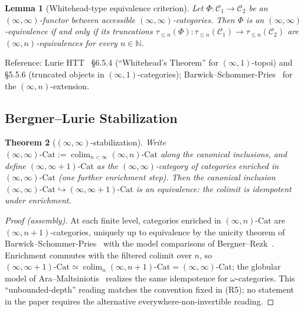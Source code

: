 \documentclass[11pt]{article}
\theoremstyle{plain}
\newtheorem{theorem}{Theorem}[section]
\newtheorem{lemma}[theorem]{Lemma}
\theoremstyle{definition}
\newcommand{\cC}{\mathcal{C}}
\newcommand{\Cat}{\mathrm{Cat}}
\DeclareMathOperator{\colim}{colim}
\begin{document}
\begin{lemma}[Whitehead-type equivalence criterion]\label{lem:whitehead}
Let $\Phi : \cC_1 \to \cC_2$ be an $(\infty, \infty)$-functor between accessible $(\infty, \infty)$-categories. Then $\Phi$ is an $(\infty, \infty)$-equivalence if and only if its truncations $\tau_{\leq n}(\Phi) : \tau_{\leq n}(\cC_1) \to \tau_{\leq n}(\cC_2)$ are $(\infty, n)$-equivalences for every $n \in \mathbb{N}$.
\end{lemma}

Reference: Lurie HTT~\cite{LurieHTT} \S 6.5.4 (``Whitehead's Theorem'' for $(\infty, 1)$-topoi) and \S 5.5.6 (truncated objects in $(\infty, 1)$-categories); Barwick--Schommer-Pries~\cite{BarwickSchommerPries2021} for the $(\infty, n)$-extension.

\subsection{Bergner--Lurie Stabilization}

\begin{theorem}[$(\infty, \infty)$-stabilization]\label{thm:bergner-lurie-stab}
Write $(\infty, \infty)\text{-}\Cat := \colim_{n < \infty} (\infty, n)\text{-}\Cat$ along the canonical inclusions, and define $(\infty, \infty + 1)\text{-}\Cat$ as the $(\infty, \infty)$-category of categories enriched in $(\infty, \infty)\text{-}\Cat$ (one further enrichment step). Then the canonical inclusion $(\infty, \infty)\text{-}\Cat \hookrightarrow (\infty, \infty + 1)\text{-}\Cat$ is an equivalence: the colimit is idempotent under enrichment.
\end{theorem}

\begin{proof}[Proof (assembly)]
At each finite level, categories enriched in $(\infty, n)\text{-}\Cat$ are $(\infty, n+1)$-categories, uniquely up to equivalence by the unicity theorem of Barwick--Schommer-Pries~\cite{BarwickSchommerPries2021} with the model comparisons of Bergner--Rezk~\cite{BergnerRezk2013}. Enrichment commutes with the filtered colimit over $n$, so $(\infty, \infty+1)\text{-}\Cat \simeq \colim_n (\infty, n+1)\text{-}\Cat = (\infty, \infty)\text{-}\Cat$; the globular model of Ara--Maltsiniotis~\cite{AraMaltsiniotis2017} realizes the same idempotence for $\omega$-categories. This ``unbounded-depth'' reading matches the convention fixed in (R5); no statement in the paper requires the alternative everywhere-non-invertible reading.
\end{proof}
\end{document}
